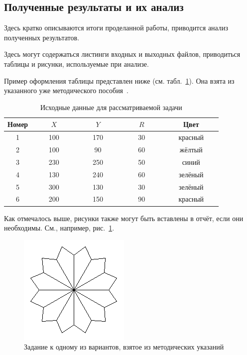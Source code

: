 \subsection{Полученные результаты и их анализ}

Здесь кратко описываются итоги проделанной работы, приводится анализ полученных результатов.

Здесь могут содержаться листинги входных и выходных файлов, приводиться таблицы и рисунки, используемые при анализе.

Пример оформления таблицы представлен ниже (см. табл.~\ref{tabl:1}). Она взята из указанного уже методического пособия~\cite{gutgut:1}.

\begin{center}
\begin{table}[h!]
\centering
\caption{Исходные данные для рассматриваемой задачи}
\label{tabl:1}
\begin{tabular}{|c|c|c|c|c|}
\hline
Номер &~~~~$X$~~~~ &~~~~$Y$~~~~&~~~~$R$~~~~&~~~~Цвет~~~~\\
\hline
1 &	100  &	170 & 30 & \color{red} красный\\
2 &	100  &	90	& 60 & \color{yellow} жёлтый\\
3 &	230  &	250	& 50 & \color{blue} синий\\
4 &	130  &	240 & 60 & \color{green} зелёный\\
5 & 300  &	130 & 30 & \color{green} зелёный\\
6 &	200  &	150	& 90 & \color{red} красный\\
\hline
\end{tabular}
\end{table}
\end{center}

Как отмечалось выше, рисунки также могут быть вставлены в отчёт, если они необходимы. См., например, рис.~\ref{fig:1}.

\begin{figure}[h!]
\centering
\includegraphics[scale=1.0]{img33892}

\caption{Задание к одному из вариантов, взятое из методических указаний~\cite{gutgut:2}}
\label{fig:1}
\end{figure}

